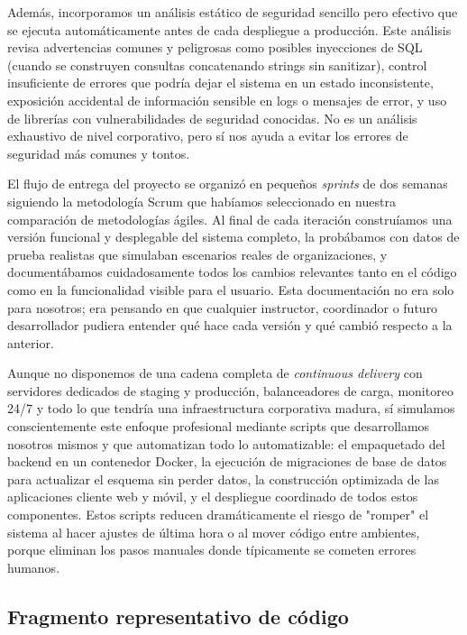 Además, incorporamos un análisis estático de seguridad sencillo pero efectivo que se ejecuta automáticamente antes de cada despliegue a producción. Este análisis revisa advertencias comunes y peligrosas como posibles inyecciones de SQL (cuando se construyen consultas concatenando strings sin sanitizar), control insuficiente de errores que podría dejar el sistema en un estado inconsistente, exposición accidental de información sensible en logs o mensajes de error, y uso de librerías con vulnerabilidades de seguridad conocidas. No es un análisis exhaustivo de nivel corporativo, pero sí nos ayuda a evitar los errores de seguridad más comunes y tontos.

El flujo de entrega del proyecto se organizó en pequeños \textit{sprints} de dos semanas siguiendo la metodología Scrum que habíamos seleccionado en nuestra comparación de metodologías ágiles. Al final de cada iteración construíamos una versión funcional y desplegable del sistema completo, la probábamos  con datos de prueba realistas que simulaban escenarios reales de organizaciones, y documentábamos cuidadosamente todos los cambios relevantes tanto en el código como en la funcionalidad visible para el usuario. Esta documentación no era solo para nosotros; era pensando en que cualquier instructor, coordinador o futuro desarrollador pudiera entender qué hace cada versión y qué cambió respecto a la anterior.

Aunque no disponemos de una cadena completa de \textit{continuous delivery} con servidores dedicados de staging y producción, balanceadores de carga, monitoreo 24/7 y todo lo que tendría una infraestructura corporativa madura, sí simulamos conscientemente este enfoque profesional mediante scripts que desarrollamos nosotros mismos y que automatizan todo lo automatizable: el empaquetado del backend en un contenedor Docker, la ejecución de migraciones de base de datos para actualizar el esquema sin perder datos, la construcción optimizada de las aplicaciones cliente web y móvil, y el despliegue coordinado de todos estos componentes. Estos scripts reducen dramáticamente el riesgo de "romper" el sistema al hacer ajustes de última hora o al mover código entre ambientes, porque eliminan los pasos manuales donde típicamente se cometen errores humanos.

\subsection{Fragmento representativo de código}

